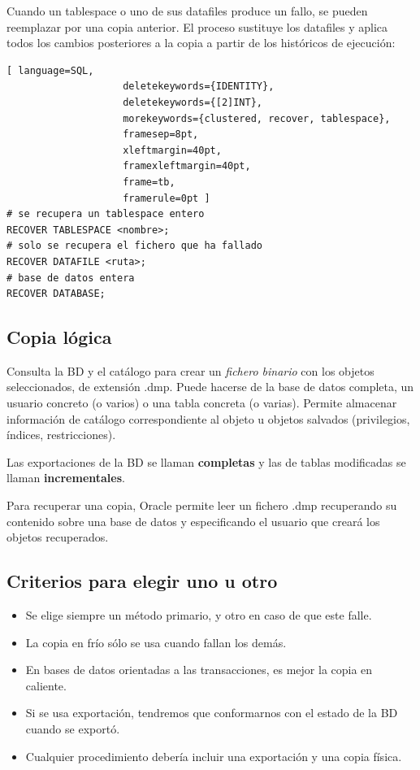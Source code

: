 Cuando un tablespace o uno de sus datafiles produce un fallo, se pueden reemplazar por una copia anterior. El proceso sustituye los datafiles y aplica todos los cambios posteriores a la copia a partir de los históricos de ejecución:
\begin{lstlisting}[ language=SQL,
                    deletekeywords={IDENTITY},
                    deletekeywords={[2]INT},
                    morekeywords={clustered, recover, tablespace},
                    framesep=8pt,
                    xleftmargin=40pt,
                    framexleftmargin=40pt,
                    frame=tb,
                    framerule=0pt ]
# se recupera un tablespace entero
RECOVER TABLESPACE <nombre>;
# solo se recupera el fichero que ha fallado
RECOVER DATAFILE <ruta>;
# base de datos entera
RECOVER DATABASE;
\end{lstlisting}

\subsection{Copia lógica}

Consulta la BD y el catálogo para crear un \textit{fichero binario} con los objetos seleccionados, de extensión .dmp. Puede hacerse de la base de datos completa, un usuario concreto (o varios) o una tabla concreta (o varias). Permite almacenar información de catálogo correspondiente al objeto u objetos salvados (privilegios, índices, restricciones).

Las exportaciones de la BD se llaman \textbf{completas} y las de tablas modificadas se llaman \textbf{incrementales}.

Para recuperar una copia, Oracle permite leer un fichero .dmp recuperando su contenido sobre una base de datos y especificando el usuario que creará los objetos recuperados.

\subsection{Criterios para elegir uno u otro}

\begin{itemize}
\item Se elige siempre un método primario, y otro en caso de que este falle.
\item La copia en frío sólo se usa cuando fallan los demás.
\item En bases de datos orientadas a las transacciones, es mejor la copia en caliente.
\item Si se usa exportación, tendremos que conformarnos con el estado de la BD cuando se exportó.
\item Cualquier procedimiento debería incluir una exportación y una copia física.
\end{itemize}